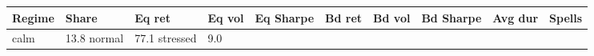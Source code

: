 \begin{tabular}{llllllllrr}
\toprule
Regime & Share & Eq ret & Eq vol & Eq Sharpe & Bd ret & Bd vol & Bd Sharpe & Avg dur & Spells \\
\midrule
calm & 13.8%
normal & 77.1%
stressed & 9.0%
\bottomrule
\end{tabular}
